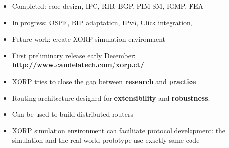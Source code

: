 \documentclass[landscape]{icsislides}
\begin{document}
\begin{slide}

\begin{itemize}

  \item Completed: core design, IPC, RIB, BGP, PIM-SM, IGMP, FEA

  \item In progress: OSPF, RIP adaptation, IPv6, Click integration,

  \item Future work: create XORP simulation environment

  \item First preliminary release early December: \\
  {\bf http://www.candelatech.com/xorp.ct/}

\end{itemize}

\end{slide}

\begin{slide}

\begin{itemize}

  \item XORP tries to close the gap between {\bf research} and {\bf practice}

  \item Routing architecture designed for {\bf extensibility} and {\bf
  robustness}.

  \item Can be used to build distributed routers

  \item XORP simulation environment can facilitate protocol development: the
  simulation and the real-world prototype use exactly same code

\end{itemize}

\end{slide}

\end{document}
